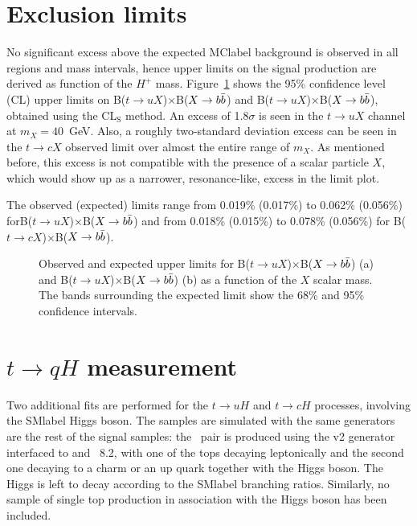 \clearpage

\section{Exclusion limits}

No significant excess above the expected \acrshort{MClabel} background is observed in all regions and mass intervals, hence upper limits on the signal production are derived as function of the $H^+$ mass. Figure~\ref{tqX:xseclimits} shows the 95\% confidence level (CL) upper limits on B($t\to uX$)$\times$B($X\to b\bar{b}$) and B($t\to uX$)$\times$B($X\to b\bar{b}$), obtained using the CL$_\text{S}$ method. An excess of 1.8$\sigma$ is seen in the $t\to uX$ channel at $m_X=40$~GeV. Also, a roughly two-standard deviation excess can be seen in the $t\to cX$ observed limit over almost the entire range of $m_X$. As mentioned before, this excess is not compatible with the presence of a scalar particle $X$, which would show up as a narrower, resonance-like, excess in the limit plot.

The observed (expected) limits range from 0.019\% (0.017\%) to 0.062\% (0.056\%) forB($t\to uX$)$\times$B($X\to b\bar{b}$) and from 0.018\% (0.015\%) to 0.078\% (0.056\%) for B($t\to cX$)$\times$B($X\to b\bar{b}$).

\begin{figure}[htb]
    \RawFloats
    \centering
    \caption{Observed and expected upper limits for B($t\to uX$)$\times$B($X\to b\bar{b}$) (a) and B($t\to uX$)$\times$B($X\to b\bar{b}$) (b) as a function of the $X$ scalar mass. The bands surrounding the expected limit show the 68\% and 95\% confidence intervals.}
    \label{tqX:xseclimits}
\end{figure}

\section{$t\to qH$ measurement}

Two additional fits are performed for the $t\to uH$ and $t\to cH$ processes, involving the \acrshort{SMlabel} Higgs boson. The samples are simulated with the same generators are the rest of the signal samples: the \ttbar\ pair is produced using the \POWHEGBOX v2 generator interfaced to \MADSPIN and \PYTHIA~8.2, with one of the tops decaying leptonically and the second one decaying to a charm or an up quark together with the Higgs boson. The Higgs is left to decay according to the \acrshort{SMlabel} branching ratios. Similarly, no sample of single top production in association with the Higgs boson has been included.

